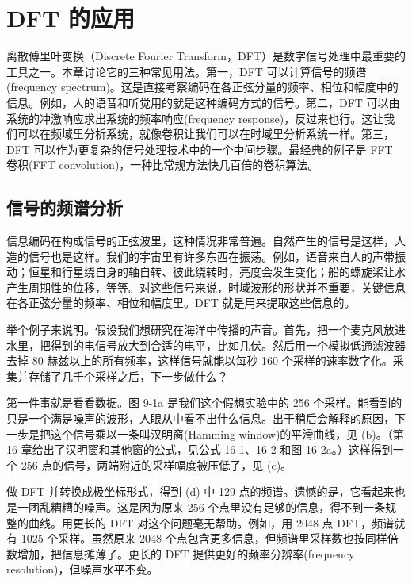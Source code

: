 
\chapter{DFT 的应用}\label{ch-09}

离散傅里叶变换（Discrete Fourier
Transform，DFT）是数字信号处理中最重要的工具之一。本章讨论它的三种常见用法。第一，DFT
可以计算信号的频谱(frequency
spectrum)。这是直接考察编码在各正弦分量的频率、相位和幅度中的信息。例如，人的语音和听觉用的就是这种编码方式的信号。第二，DFT
可以由系统的冲激响应求出系统的频率响应(frequency
response)，反过来也行。这让我们可以在频域里分析系统，就像卷积让我们可以在时域里分析系统一样。第三，DFT
可以作为更复杂的信号处理技术中的一个中间步骤。最经典的例子是 FFT
卷积(FFT convolution)，一种比常规方法快几百倍的卷积算法。

\section{信号的频谱分析}

信息编码在构成信号的正弦波里，这种情况非常普遍。自然产生的信号是这样，人造的信号也是这样。我们的宇宙里有许多东西在振荡。例如，语音来自人的声带振动；恒星和行星绕自身的轴自转、彼此绕转时，亮度会发生变化；船的螺旋桨让水产生周期性的位移，等等。对这些信号来说，时域波形的形状并不重要，关键信息在各正弦分量的频率、相位和幅度里。DFT
就是用来提取这些信息的。

举个例子来说明。假设我们想研究在海洋中传播的声音。首先，把一个麦克风放进水里，把得到的电信号放大到合适的电平，比如几伏。然后用一个模拟低通滤波器去掉
80 赫兹以上的所有频率，这样信号就能以每秒 160
个采样的速率数字化。采集并存储了几千个采样之后，下一步做什么？

第一件事就是看看数据。图 9-1a 是我们这个假想实验中的 256
个采样。能看到的只是一个满是噪声的波形，人眼从中看不出什么信息。出于稍后会解释的原因，下一步是把这个信号乘以一条叫汉明窗(Hamming
window)的平滑曲线，见 (b)。（第 16 章给出了汉明窗和其他窗的公式，见公式
16-1、16-2 和图 16-2a。）这样得到一个 256
点的信号，两端附近的采样幅度被压低了，见 (c)。

做 DFT 并转换成极坐标形式，得到 (d) 中 129
点的频谱。遗憾的是，它看起来也是一团乱糟糟的噪声。这是因为原来 256
个点里没有足够的信息，得不到一条规整的曲线。用更长的 DFT
对这个问题毫无帮助。例如，用 2048 点 DFT，频谱就有 1025 个采样。虽然原来
2048
个点包含更多信息，但频谱里采样数也按同样倍数增加，把信息摊薄了。更长的
DFT 提供更好的频率分辨率(frequency resolution)，但噪声水平不变。

